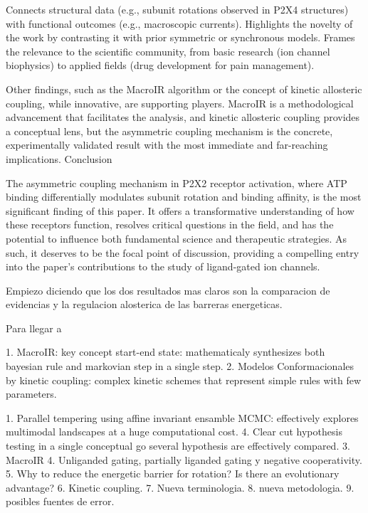 \documentclass[a4paper,12pt]{article}
\begin{document}
		Connects structural data (e.g., subunit rotations observed in P2X4 structures) with functional outcomes (e.g., macroscopic currents).
		Highlights the novelty of the work by contrasting it with prior symmetric or synchronous models.
		Frames the relevance to the scientific community, from basic research (ion channel biophysics) to applied fields (drug development for pain management).
		
		Other findings, such as the MacroIR algorithm or the concept of kinetic allosteric coupling, while innovative, are supporting players. MacroIR is a methodological advancement that facilitates the analysis, and kinetic allosteric coupling provides a conceptual lens, but the asymmetric coupling mechanism is the concrete, experimentally validated result with the most immediate and far-reaching implications.
		Conclusion
		
		The asymmetric coupling mechanism in P2X2 receptor activation, where ATP binding differentially modulates subunit rotation and binding affinity, is the most significant finding of this paper. It offers a transformative understanding of how these receptors function, resolves critical questions in the field, and has the potential to influence both fundamental science and therapeutic strategies. As such, it deserves to be the focal point of discussion, providing a compelling entry into the paper’s contributions to the study of ligand-gated ion channels.
		
		
		Empiezo diciendo que los dos resultados mas claros son la comparacion de evidencias y la regulacion alosterica de las barreras energeticas. 
		
		Para llegar a 
		
		
		1. MacroIR: key concept start-end state: mathematicaly synthesizes both bayesian rule and markovian step in a single step. 
		2. Modelos Conformacionales by kinetic coupling: complex kinetic schemes that represent simple rules with few parameters. 
		
		1. Parallel tempering using affine invariant ensamble MCMC: effectively explores multimodal landscapes at a huge computational cost. 
		4. Clear cut hypothesis testing in a single conceptual go several hypothesis are effectively compared. 
		3. MacroIR
		4. Unliganded gating, partially liganded gating y negative cooperativity.
		5. Why to reduce the energetic barrier for rotation? Is there an evolutionary advantage?
		6. Kinetic coupling. 
		7. Nueva terminologia.
		8. nueva metodologia. 
		9. posibles fuentes de error. 
		
\end{document}
